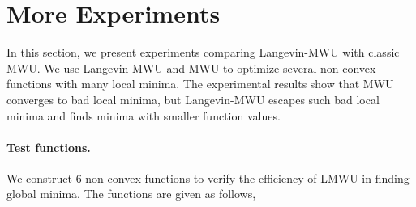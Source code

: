 \section{More Experiments}

In this section, we present experiments comparing Langevin-MWU  with classic MWU. We use Langevin-MWU and MWU to optimize several non-convex functions with many local minima. The experimental results show that MWU converges to bad local minima, but Langevin-MWU escapes such bad local minima and finds minima with smaller function values.

\paragraph{Test functions.}
We construct 6 non-convex functions to verify the efficiency of LMWU in finding global minima. The functions are given as follows,
